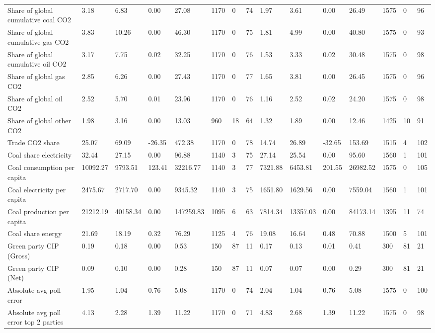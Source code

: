 \begin{longtable}{lllllllllllllll}
Share of global cumulative coal CO2 & 3.18 & 6.83 & 0.00 & 27.08 & 1170 & 0 & 74 & 1.97 & 3.61 & 0.00 & 26.49 & 1575 & 0 & 96\\
Share of global cumulative gas CO2 & 3.83 & 10.26 & 0.00 & 46.30 & 1170 & 0 & 75 & 1.81 & 4.99 & 0.00 & 40.80 & 1575 & 0 & 93\\
Share of global cumulative oil CO2 & 3.17 & 7.75 & 0.02 & 32.25 & 1170 & 0 & 76 & 1.53 & 3.33 & 0.02 & 30.48 & 1575 & 0 & 98\\
\addlinespace
Share of global gas CO2 & 2.85 & 6.26 & 0.00 & 27.43 & 1170 & 0 & 77 & 1.65 & 3.81 & 0.00 & 26.45 & 1575 & 0 & 96\\
Share of global oil CO2 & 2.52 & 5.70 & 0.01 & 23.96 & 1170 & 0 & 76 & 1.16 & 2.52 & 0.02 & 24.20 & 1575 & 0 & 98\\
Share of global other CO2 & 1.98 & 3.16 & 0.00 & 13.03 & 960 & 18 & 64 & 1.32 & 1.89 & 0.00 & 12.46 & 1425 & 10 & 91\\
Trade CO2 share & 25.07 & 69.09 & -26.35 & 472.38 & 1170 & 0 & 78 & 14.74 & 26.89 & -32.65 & 153.69 & 1515 & 4 & 102\\
Coal share electricity & 32.44 & 27.15 & 0.00 & 96.88 & 1140 & 3 & 75 & 27.14 & 25.54 & 0.00 & 95.60 & 1560 & 1 & 101\\
\addlinespace
Coal consumption per capita & 10092.27 & 9793.51 & 123.41 & 32216.77 & 1140 & 3 & 77 & 7321.88 & 6453.81 & 201.55 & 26982.52 & 1575 & 0 & 105\\
Coal electricity per capita & 2475.67 & 2717.70 & 0.00 & 9345.32 & 1140 & 3 & 75 & 1651.80 & 1629.56 & 0.00 & 7559.04 & 1560 & 1 & 101\\
Coal production per capita & 21212.19 & 40158.34 & 0.00 & 147259.83 & 1095 & 6 & 63 & 7814.34 & 13357.03 & 0.00 & 84173.14 & 1395 & 11 & 74\\
Coal share energy & 21.69 & 18.19 & 0.32 & 76.29 & 1125 & 4 & 76 & 19.08 & 16.64 & 0.48 & 70.88 & 1500 & 5 & 101\\
Green party CIP (Gross) & 0.19 & 0.18 & 0.00 & 0.53 & 150 & 87 & 11 & 0.17 & 0.13 & 0.01 & 0.41 & 300 & 81 & 21\\
\addlinespace
Green party CIP (Net) & 0.09 & 0.10 & 0.00 & 0.28 & 150 & 87 & 11 & 0.07 & 0.07 & 0.00 & 0.29 & 300 & 81 & 21\\
Absolute avg poll error & 1.95 & 1.04 & 0.76 & 5.08 & 1170 & 0 & 74 & 2.04 & 1.04 & 0.76 & 5.08 & 1575 & 0 & 100\\
Absolute avg poll error top 2 parties & 4.13 & 2.28 & 1.39 & 11.22 & 1170 & 0 & 71 & 4.83 & 2.68 & 1.39 & 11.22 & 1575 & 0 & 98\\

\end{longtable}
